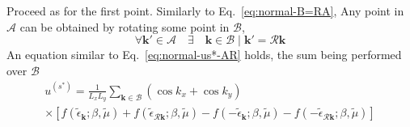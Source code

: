 \begin{enumerate}
	Proceed as for the first point. Similarly to Eq.~\eqref{eq:normal-B=RA}, Any point in $\mathcal{A}$ can be obtained by rotating some point in $\mathcal{B}$,
	\begin{equation}\label{eq:normal-A=RB}
		\forall \mathbf{k}' \in \mathcal{A} 
		\quad\exists\quad \mathbf{k} \in \mathcal{B} \mid \mathbf{k}' = \mathcal{R} \mathbf{k}
	\end{equation}
	An equation similar to Eq.~\eqref{eq:normal-us*-AR} holds, the sum being performed over $\mathcal{B}$
	\begin{multline}
		u^{(s^*)} = \frac{1}{L_x L_y} \sum_{\mathbf{k}\in\mathcal{B}} (\cos k_x + \cos k_y) \\
		\times \left[
		f(\tilde{\epsilon}_\mathbf{k};\beta,\tilde{\mu}) + f(\tilde{\epsilon}_{\mathcal{R}\mathbf{k}};\beta,\tilde{\mu}) - f(-\tilde{\epsilon}_\mathbf{k};\beta,\tilde{\mu}) - f(-\tilde{\epsilon}_{\mathcal{R}\mathbf{k}};\beta,\tilde{\mu})
		\right]
		\label{eq:normal-us*-BR}
	\end{multline}
	

\end{enumerate}
